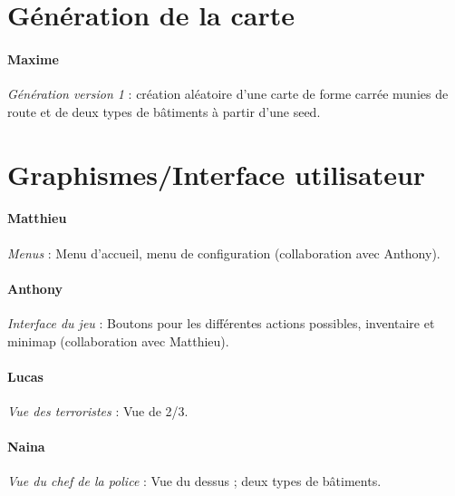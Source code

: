 \documentclass[a4paper]{article}
\begin{document}
\section{Génération de la carte}
\paragraph{Maxime} \emph{Génération version 1} : création aléatoire d'une carte de forme carrée munies de route et de deux types de bâtiments à partir d'une seed.

\section{Graphismes/Interface utilisateur}
\paragraph{Matthieu} \emph{Menus} : Menu d'accueil, menu de configuration (collaboration avec Anthony).


\paragraph{Anthony} \emph{Interface du jeu} : Boutons pour les différentes actions possibles, inventaire et minimap (collaboration avec Matthieu).

\paragraph{Lucas} \emph{Vue des terroristes} : Vue de 2/3.

\paragraph{Naina} \emph{Vue du chef de la police} : Vue du dessus ; deux types de bâtiments.
\end{document}
